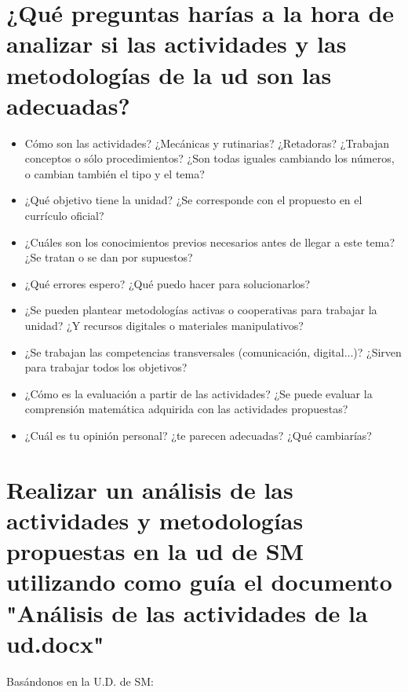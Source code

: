 \newpage\section{¿Qué preguntas harías a la hora de analizar si las actividades y las metodologías de la ud son las adecuadas?}

\begin{itemize}
\item Cómo son las actividades? ¿Mecánicas y rutinarias? ¿Retadoras? ¿Trabajan conceptos o sólo procedimientos? ¿Son todas iguales cambiando los números, o cambian también el tipo y el tema?

\item ¿Qué objetivo tiene la unidad? ¿Se corresponde con el propuesto en el currículo oficial?

\item ¿Cuáles son los conocimientos previos necesarios antes de llegar a este tema? ¿Se tratan o se dan por supuestos?

\item ¿Qué errores espero? ¿Qué puedo hacer para solucionarlos?

\item ¿Se pueden plantear metodologías activas o cooperativas para trabajar la unidad? ¿Y recursos digitales o materiales manipulativos?

\item ¿Se trabajan las competencias transversales (comunicación, digital...)? ¿Sirven para trabajar todos los objetivos?

\item ¿Cómo es la evaluación a partir de las actividades? ¿Se puede evaluar la comprensión matemática adquirida con las actividades propuestas?

\item ¿Cuál es tu opinión personal? ¿te parecen adecuadas? ¿Qué cambiarías?
\end{itemize}





\newpage\section{Realizar un análisis de las actividades y metodologías propuestas en la ud de SM utilizando como guía el documento "Análisis de las actividades de la ud.docx"}

Basándonos en la U.D. de SM:

